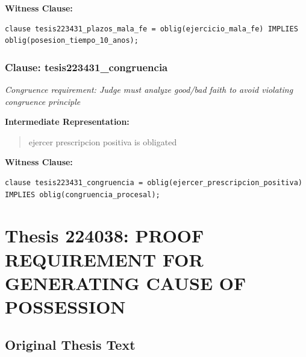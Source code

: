 \documentclass[11pt,a4paper]{article}
\begin{document}
\textbf{Witness Clause:}

\begin{lstlisting}[style=witnessstyle, language=Witness]
clause tesis223431_plazos_mala_fe = oblig(ejercicio_mala_fe) IMPLIES oblig(posesion_tiempo_10_anos);
\end{lstlisting}

\subsubsection{Clause: tesis223431\_congruencia}

\textit{Congruence requirement: Judge must analyze good/bad faith to avoid violating congruence principle}

\textbf{Intermediate Representation:}

\begin{quote}
ejercer prescripcion positiva is obligated
\end{quote}

\textbf{Witness Clause:}

\begin{lstlisting}[style=witnessstyle, language=Witness]
clause tesis223431_congruencia = oblig(ejercer_prescripcion_positiva) IMPLIES oblig(congruencia_procesal);
\end{lstlisting}

\newpage

\section{Thesis 224038: PROOF REQUIREMENT FOR GENERATING CAUSE OF POSSESSION}
\label{thesis:224038}

\subsection{Original Thesis Text}
\end{document}
